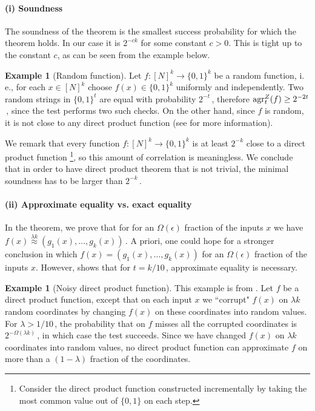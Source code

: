 \documentclass[11pt]{article}
\numberwithin{equation}{section}
\theoremstyle{definition}
\newtheorem{example}[theorem]{Example}
\theoremstyle{plain}
\newcommand{\ie}{i.\,e.}
\newcommand\f{f} %
\newcommand{\test}[2]{
	\ifx &#2&
	\textrm{agr}^{#1}
	\else	
	\textrm{agr}^{#1}_{#2}
	\fi}
\newcommand\neql[1]{\stackrel{{#1}}{ \approx}} %
\begin{document}
\paragraph*{(i) Soundness} The soundness of the theorem is the smallest success probability for which the theorem holds. In our case it is $2^{-c k}$ for some constant $c > 0$. This is tight up to the constant $c$, as can be seen from the example below.
\begin{example}[Random function]\label{ex:random}
	Let $\f:[N]^k\rightarrow\{0,1\}^k$ be a random 
function, %
\ie, for each $x\in [N]^k$ choose $f(x) \in \{0,1\}^k$ uniformly and independently. Two random strings in $\{0,1\}^t$ are equal with probability $2^{-t}$\,, therefore $\test{Z}{t}(f) \geq 2^{-2t}$\,, since the test performs two such checks.
	On the other hand, since $\f$ is random, it is not close to any direct product function (see  for more information).
\end{example}
We remark that every function $\f:[N]^k\rightarrow\{0,1\}^k$ is at least $2^{-k}$ close to a direct product function \footnote{Consider the direct product function constructed incrementally by taking the most common value out of $\{0,1\}$ on each step.}, so this amount of correlation is meaningless.
We conclude that in order to have direct product theorem that is not trivial, the minimal soundness has to be larger than $2^{-k}$\,. 

\paragraph*{(ii) Approximate equality vs. exact equality}
In the theorem, we prove that for
%
for an $\Omega(\epsilon)$ fraction of the inputs $x$ we have %
$f(x)\neql{\lambda k}(g_1(x),\ldots,g_k(x))$\,. A priori, one could hope for
a stronger conclusion in which $f(x) = (g_1(x),\ldots,g_k(x))$ for
%
an $\Omega(\epsilon)$ fraction of the inputs $x$.  %
However,  shows that for $t=k/10$\,, approximate equality is necessary.
\begin{example}[Noisy direct product function] \label{ex:noisy DP func}
	This example is from \cite{dinur2008locally}.
	Let $\f$ be a direct product function, except that on each input $x$ we ``corrupt" $\f(x)$ on $\lambda k$ random coordinates by changing $\f(x)$ on these coordinates into random values. For 
	$\lambda > 1/10$\,, %
	the probability that  on $\f$ misses all the corrupted coordinates is $2^{-\Omega(\lambda k)}$\,, in which case the test succeeds. Since we have changed $\f(x)$ on $\lambda k$ coordinates into random values, no direct product function can approximate $\f$ on more than
a  %
$(1-\lambda)$ fraction of the coordinates.
\end{example}
\end{document}
